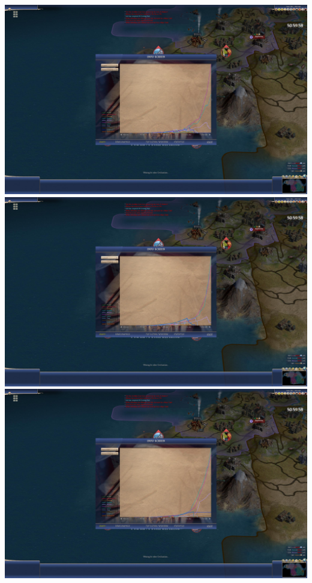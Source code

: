 \documentclass[10pt]{article}
\begin{document}
\includegraphics[width=1.0\textwidth]{end-5}
\includegraphics[width=1.0\textwidth]{end-6}
\includegraphics[width=1.0\textwidth]{end-7}
\end{document}
